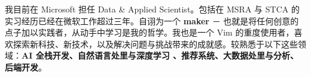 

\begin{cvparagraph}

我目前在 Microsoft 担任 Data \& Applied Scientist。包括在 MSRA 与 STCA 的实习经历已经在微软工作超过三年。自诩为一个 \textbf{maker} － 也就是将任何创意的点子加以实践者，从动手中学习是我的哲学。我也是一个 Vim 的重度使用者，喜欢探索新科技、新技术，以及解决问题与挑战带来的成就感。较熟悉于以下这些领域：\textbf{AI 全栈开发、自然语言处里与深度学习 、推荐系统、大数据处里与分析、后端开发}。

\end{cvparagraph}
